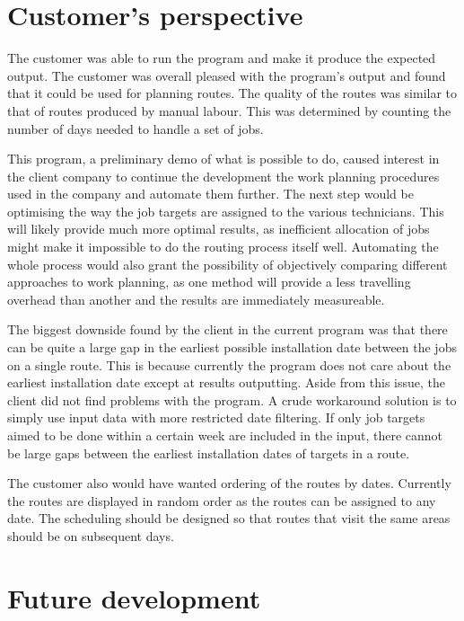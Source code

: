 \section{Customer's perspective}

The customer was able to run the program and make it produce the expected output. The customer was overall pleased with the program's output and found that it could be used for planning routes. The quality of the routes was similar to that of routes produced by manual labour. This was determined by counting the number of days needed to handle a set of jobs.  

This program, a preliminary demo of what is possible to do, caused interest in the client company to continue the development the work planning procedures used in the company and automate them further. The next step would be optimising the way the job targets are assigned to the various technicians. This will likely provide much more optimal results, as inefficient allocation of jobs might make it impossible to do the routing process itself well. Automating the whole process would also grant the possibility of objectively comparing different approaches to work planning, as one method will provide a less travelling overhead than another and the results are immediately measureable.   

The biggest downside found by the client in the current program was that there can be quite a large gap in the earliest possible installation date between the jobs on a single route. This is because currently the program does not care about the earliest installation date except at results outputting. Aside from this issue, the client did not find problems with the program. A crude workaround solution is to simply use input data with more restricted date filtering. If only job targets aimed to be done within a certain week are included in the input, there cannot be large gaps between the earliest installation dates of targets in a route.

The customer also would have wanted ordering of the routes by dates. Currently the routes are displayed in random order as the routes can be assigned to any date. The scheduling should be designed so that routes that visit the same areas should be on subsequent days.



\section{Future development}

